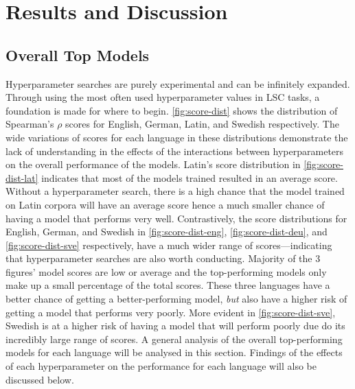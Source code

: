 \section{Results and Discussion}
\label{sec:results}

\subsection{Overall Top Models}

Hyperparameter searches are purely experimental and can be infinitely expanded. Through using the most often used hyperparameter values in LSC tasks, a foundation is made for where to begin. \autoref{fig:score-dist} shows the distribution of Spearman's $\rho$ scores for English, German, Latin, and Swedish respectively. The wide variations of scores for each language in these distributions demonstrate the lack of understanding in the effects of the interactions between hyperparameters on the overall performance of the models. Latin's score distribution in \autoref{fig:score-dist-lat} indicates that most of the models trained resulted in an average score. Without a hyperparameter search, there is a high chance that the model trained on Latin corpora will have an average score hence a much smaller chance of having a model that performs very well. Contrastively, the score distributions for English, German, and Swedish in  \autoref{fig:score-dist-eng}, \autoref{fig:score-dist-deu}, and \autoref{fig:score-dist-sve} respectively, have a much wider range of scores⁠⁠—indicating that hyperparameter searches are also worth conducting. Majority of the 3 figures' model scores are low or average and the top-performing models only make up a small percentage of the total scores. These three languages have a better chance of getting a better-performing model, \emph{but} also have a higher risk of getting a model that performs very poorly. More evident in \autoref{fig:score-dist-sve}, Swedish is at a higher risk of having a model that will perform poorly due do its incredibly large range of scores. A general analysis of the overall top-performing models for each language will be analysed in this section. Findings of the effects of each hyperparameter on the performance for each language will also be discussed below. 

